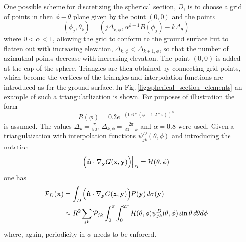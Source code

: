 One possible scheme for discretizing the spherical section, $D$, is to choose a grid of points in then $\phi - \theta$ plane given by the point $(0,0)$ and the points
\[
(\phi_j,\theta_k)=(j\Delta_{k,\phi},\alpha^{k-1}B(\phi_j)-k\Delta_\theta)
\]
where $0<\alpha<1$, allowing the grid to conform to the ground surface but to flatten out with increasing elevation, $\Delta_{k,\phi}<\Delta_{k+1,\phi}$, so that the number of azimuthal points decrease with increasing elevation. The point $(0,0)$ is added at the cap of the sphere. Triangles are then obtained by connecting grid points, which become the vertices of the triangles and interpolation functions are introduced as for the ground surface. In Fig.\,\ref{fig:spherical_section_elements} an example of such a triangularlization is shown. For purposes of illustration the form 
\[
B(\phi)=0.2e^{-(0.6*(\phi-1.2*\pi))^6}
\]
is assumed. The values $\Delta_k=\frac{\pi}{50}$, $\Delta_{k,\phi}=\frac{2\pi}{31-k}$ and $\alpha=0.8$ were used. Given a triangulaization with interpolation functions $\psi^{D}_{jk}(\theta,\phi)$ and introducing the notation 
\[
\Big({\bf \hat n}\cdot\nabla_{\bf y} G({\bf x},{\bf y})\Big)\Big|_D={\cal H}(\theta,\phi)
\]
one has 
\begin{align*}
{\cal P}_D({\bf x})
&=
\int_{D} 
\Big({\bf \hat n}\cdot\nabla_{\bf y} G({\bf x},{\bf y})\Big)P({\bf y})
\, d\sigma({\bf y})\\
&\approx
R^2\sum_{jk} {\cal P}_{jk}\int_0^\pi\int_0^{2\pi} {\cal H}(\theta,\phi)\psi^{D}_{jk}(\theta,\phi)\sin\theta\, d\theta d\phi
\end{align*}
where, again, periodicity in $\phi$ needs to be enforced. 
